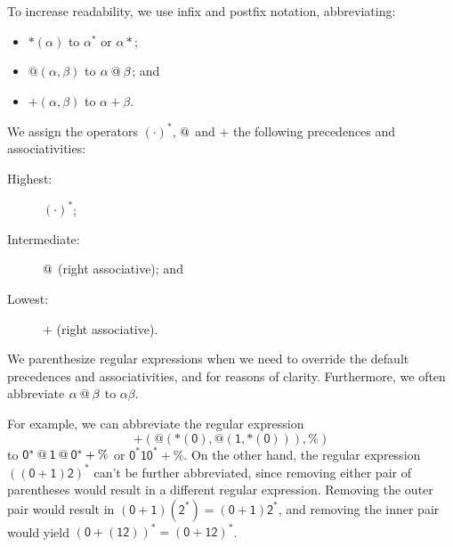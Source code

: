 To increase readability, we use infix and postfix notation, abbreviating:
\begin{itemize}
\item ${*}(\alpha)$ to $\alpha^*$ or $\alpha{*}$;

\item $@(\alpha,\beta)$ to $\alpha\mathbin{@} \beta$; and

\item $+(\alpha,\beta)$ to $\alpha+\beta$.
\end{itemize}
%
%
%
We assign the operators $(\cdot)^*$, $\mathbin{@}$ and $+$ the following
precedences and associativities:
\begin{description}
\item[\quad Highest:] $(\cdot)^*$;

\item[\quad Intermediate:] $\mathbin{@}$ (right associative); and

\item[\quad Lowest:] $+$ (right associative).
\end{description}
We parenthesize regular expressions when we need to override the
default precedences and associativities, and for reasons of clarity.
Furthermore, we often abbreviate $\alpha\mathbin{@}\beta$ to $\alpha\beta$.

For example, we can abbreviate the regular expression
\begin{displaymath}
\mathsf{{+}(@({*}(0),@(1,{*}(0))),\%)}
\end{displaymath}
to $\mathsf{0^*\mathbin{@} 1\mathbin{@} 0^*+\%}$ or $\mathsf{0^*10^*+\%}$.  On
the other hand, the regular expression $\mathsf{((0+1)2)^*}$ can't be
further abbreviated, since removing either pair of parentheses would
result in a different regular expression.  Removing the outer pair
would result in $\mathsf{(0+1)(2^*)}=\mathsf{(0+1)2^*}$, and removing
the inner pair would yield $\mathsf{(0+(12))^*}=\mathsf{(0+12)^*}$.

